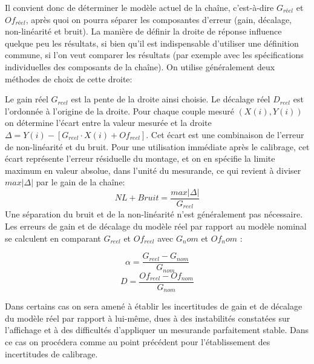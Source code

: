 Il convient donc de déterminer le modèle actuel de la chaîne, c'est-à-dire $G_{réel}$ et $Of_{réel}$, après quoi on pourra séparer les composantes d'erreur (gain, décalage, non-linéarité et bruit). La manière de définir la droite de réponse influence quelque peu les résultats, si bien qu'il est indispensable d'utiliser une définition commune, si l'on veut comparer les résultats (par exemple avec les spécifications individuelles des composants de la chaîne). On utilise généralement deux méthodes de choix de cette droite:
\begin{center}
\end{center}

Le gain réel $G_{reel}$ est la pente de la droite ainsi choisie. Le décalage réel $D_{reel}$ est l'ordonnée à l'origine de la droite. Pour chaque couple mesuré $(X(i),Y(i))$ on détermine l'écart entre la valeur mesurée et la droite $\Delta = Y(i) - [G_{reel}\cdot X(i) + Of_{reel}]$. Cet écart est une combinaison de l'erreur de non-linéarité et du bruit. Pour une utilisation immédiate après le calibrage, cet écart représente l'erreur résiduelle du montage, et on en spécifie la limite maximum en valeur absolue, dans l'unité du mesurande, ce qui revient à diviser $max{|\Delta|}$ par le gain de la chaîne:
\[
    NL+Bruit = \frac{max{|\Delta|}}{G_{reel}}
\]
Une séparation du bruit et de la non-linéarité n'est généralement pas nécessaire.
Les erreurs de gain et de décalage du modèle réel par rapport au modèle nominal se calculent en comparant $G_{reel}$ et $Of_{reel}$ avec $G_nom$ et $Of_nom$ :

\[\alpha =  \frac{G_{reel}-G_{nom}}{G_{nom}}	 \]
\[D =  \frac{Of_{reel}-Of_{nom}}{G_{nom}} \]

Dans certains cas on sera amené à établir les incertitudes de gain et de décalage du modèle réel par rapport à lui-même, dues à des instabilités constatées sur l'affichage et à des difficultés d'appliquer un mesurande parfaitement stable. Dans ce cas on procédera comme au point précédent pour l'établissement des incertitudes de calibrage.

